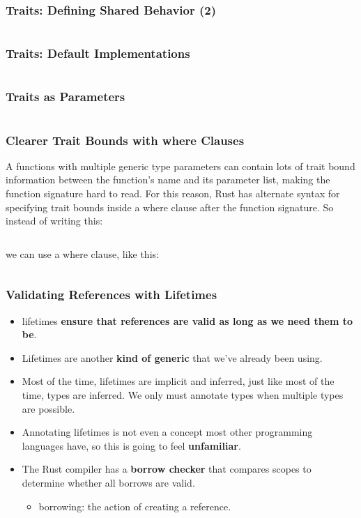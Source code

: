 \documentclass{beamer}
\begin{document}
\begin{frame}[fragile]
	\frametitle{Traits: Defining Shared Behavior (2)}
		\inputminted[fontsize=\scriptsize]{rust}{./code/Trait1.rs}
\end{frame}


\begin{frame}[fragile]
	\frametitle{Traits: Default Implementations}
	\inputminted[fontsize=\scriptsize]{rust}{./code/Trait2.rs}
\end{frame}


\begin{frame}[fragile]
	\frametitle{Traits as Parameters}
	\inputminted{rust}{./code/Trait3.rs}
\end{frame}



\begin{frame}[fragile]
	\frametitle{Clearer Trait Bounds with where Clauses}
	A functions with multiple generic type parameters can contain lots of trait bound information between the function’s name and its parameter list, making the function signature hard to read. For this reason, Rust has alternate syntax for specifying trait bounds inside a where clause after the function signature. So instead of writing this:
	
	\inputminted[fontsize=\scriptsize]{rust}{./code/trait4.rs}
	
	we can use a where clause, like this:
	
	\inputminted[fontsize=\scriptsize]{rust}{./code/trait5.rs}
\end{frame}

\begin{frame}[fragile]
	\frametitle{Validating References with Lifetimes}
	\begin{itemize}
		\item lifetimes \textbf{ensure that references are valid as long as we need them to be}.
		\item 	Lifetimes are another \textbf{kind of generic} that we’ve already been using.
		\item 	Most of the time, lifetimes are implicit and inferred, just like most of the time, types are inferred. We only must annotate types when multiple types are possible.
		\item 	Annotating lifetimes is not even a concept most other programming languages have, so this is going to feel \textbf{unfamiliar}.
		\item The Rust compiler has a\textbf{ borrow checker} that compares scopes to determine whether all borrows are valid.
		\begin{itemize}
			\item borrowing: the action of creating a reference.
		\end{itemize}
	\end{itemize}
\end{frame}
\end{document}
